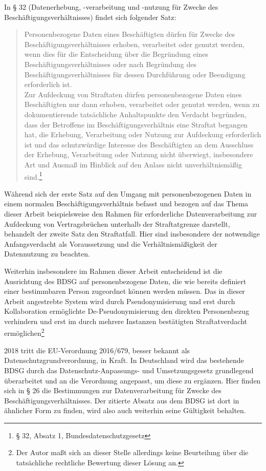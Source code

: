 In § 32 (Datenerhebung, -verarbeitung und -nutzung für Zwecke des Beschäftigungsverhältnisses) findet sich folgender Satz:
\begin{quotation}
Personenbezogene Daten eines Beschäftigten dürfen für Zwecke des Beschäftigungsverhältnisses erhoben, verarbeitet oder genutzt werden, wenn dies für die Entscheidung über die Begründung eines Beschäftigungsverhältnisses oder nach Begründung des Beschäftigungsverhältnisses für dessen Durchführung oder Beendigung erforderlich ist.\\
Zur Aufdeckung von Straftaten dürfen personenbezogene Daten eines Beschäftigten nur dann erhoben, verarbeitet oder genutzt werden, wenn zu dokumentierende tatsächliche Anhaltspunkte den Verdacht begründen, dass der Betroffene im Beschäftigungsverhältnis eine Straftat begangen hat, die Erhebung, Verarbeitung oder Nutzung zur Aufdeckung erforderlich ist und das schutzwürdige Interesse des Beschäftigten an dem Ausschluss der Erhebung, Verarbeitung oder Nutzung nicht überwiegt, insbesondere Art und Ausmaß im Hinblick auf den Anlass nicht unverhältnismäßig sind.\footnote{
  § 32, Absatz 1, Bundesdatenschutzgesetz
}
\end{quotation}

Während sich der erste Satz auf den Umgang mit personenbezogenen Daten in einem normalen Beschäftigungsverhältnis befasst und bezogen auf das Thema dieser Arbeit beispielsweise den Rahmen für erforderliche Datenverarbeitung zur Aufdeckung von Vertragsbrüchen unterhalb der Straftatgrenze darstellt, behandelt der zweite Satz den Straftatfall. Hier sind insbesondere der notwendige Anfangsverdacht als Voraussetzung und die Verhältnismäßigkeit der Datennutzung zu beachten. 

Weiterhin insbesondere im Rahmen dieser Arbeit entscheidend ist die Ausrichtung des BDSG auf personenbezogene Daten, die wie bereits definiert einer bestimmbaren Person zugeordnet können werden müssen. Das in dieser Arbeit angestrebte System wird durch Pseudonymisierung und erst durch Kollaboration ermöglichte De-Pseudonymisierung den direkten Personenbezug verhindern und erst im durch mehrere Instanzen bestätigten Straftatverdacht ermöglichen\footnote{
  Der Autor maßt sich an dieser Stelle allerdings keine Beurteilung über die tatsächliche rechtliche Bewertung dieser Lösung an.
}

2018 tritt die EU-Verordnung 2016/679, besser bekannt als Datenschutzgrundverordnung, in Kraft. In Deutschland wird das bestehende BDSG durch das Datenschutz-Anpassungs- und Umsetzungsgesetz grundlegend überarbeitet und an die Verordnung angepasst, um diese zu ergänzen. Hier finden sich in § 26 die Bestimmungen zur Datenverarbeitung für Zwecke des Beschäftigungsverhältnisses. Der zitierte Absatz aus dem BDSG ist dort in ähnlicher Form zu finden, wird also auch weiterhin seine Gültigkeit behalten. 







